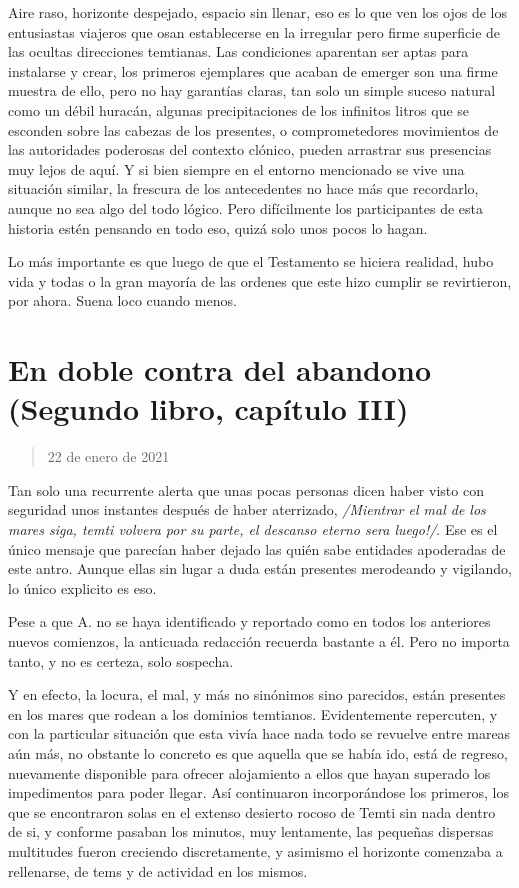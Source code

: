 \documentclass[
]{book}
\begin{document}
Aire raso, horizonte despejado, espacio sin llenar, eso es lo que ven los ojos de los entusiastas viajeros que osan establecerse en la irregular pero firme superficie de las ocultas direcciones temtianas. Las condiciones aparentan ser aptas para instalarse y crear, los primeros ejemplares que acaban de emerger son una firme muestra de ello, pero no hay garantías claras, tan solo un simple suceso natural como un débil huracán, algunas precipitaciones de los infinitos litros que se esconden sobre las cabezas de los presentes, o comprometedores movimientos de las autoridades poderosas del contexto clónico, pueden arrastrar sus presencias muy lejos de aquí. Y si bien siempre en el entorno mencionado se vive una situación similar, la frescura de los antecedentes no hace más que recordarlo, aunque no sea algo del todo lógico. Pero difícilmente los participantes de esta historia estén pensando en todo eso, quizá solo unos pocos lo hagan.

Lo más importante es que luego de que el Testamento se hiciera realidad, hubo vida y todas o la gran mayoría de las ordenes que este hizo cumplir se revirtieron, por ahora. Suena loco cuando menos.

\hypertarget{en-doble-contra-del-abandono-segundo-libro-capuxedtulo-iii}{%
\section{En doble contra del abandono (Segundo libro, capítulo III)}\label{en-doble-contra-del-abandono-segundo-libro-capuxedtulo-iii}}

\begin{quote}
22 de enero de 2021
\end{quote}

Tan solo una recurrente alerta que unas pocas personas dicen haber visto con seguridad unos instantes después de haber aterrizado, \emph{/Mientrar el mal de los mares siga, temti volvera por su parte, el descanso eterno sera luego!/}. Ese es el único mensaje que parecían haber dejado las quién sabe entidades apoderadas de este antro. Aunque ellas sin lugar a duda están presentes merodeando y vigilando, lo único explicito es eso.

Pese a que A. no se haya identificado y reportado como en todos los anteriores nuevos comienzos, la anticuada redacción recuerda bastante a él. Pero no importa tanto, y no es certeza, solo sospecha.

Y en efecto, la locura, el mal, y más no sinónimos sino parecidos, están presentes en los mares que rodean a los dominios temtianos. Evidentemente repercuten, y con la particular situación que esta vivía hace nada todo se revuelve entre mareas aún más, no obstante lo concreto es que aquella que se había ido, está de regreso, nuevamente disponible para ofrecer alojamiento a ellos que hayan superado los impedimentos para poder llegar. Así continuaron incorporándose los primeros, los que se encontraron solas en el extenso desierto rocoso de Temti sin nada dentro de si, y conforme pasaban los minutos, muy lentamente, las pequeñas dispersas multitudes fueron creciendo discretamente, y asimismo el horizonte comenzaba a rellenarse, de tems y de actividad en los mismos.
\end{document}
